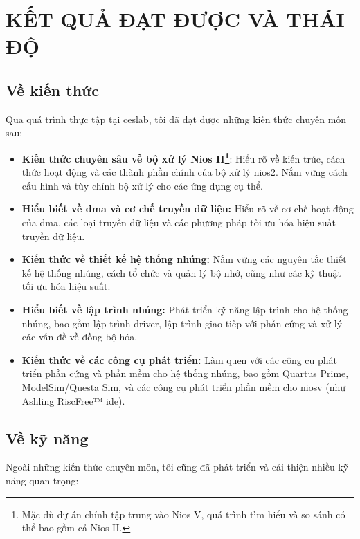 \chapter{KẾT QUẢ ĐẠT ĐƯỢC VÀ THÁI ĐỘ} %
\label{Chapter5}

\section{Về kiến thức} %
\label{sec:knowledge_gained}

Qua quá trình thực tập tại \acrshort{ceslab}, tôi đã đạt được những kiến thức chuyên môn sau:

\begin{itemize}
    \item \textbf{Kiến thức chuyên sâu về bộ xử lý Nios II\footnote{Mặc dù dự án chính tập trung vào Nios V, quá trình tìm hiểu và so sánh có thể bao gồm cả Nios II.}}: Hiểu rõ về kiến trúc, cách thức hoạt động và các thành phần chính của bộ xử lý \acrshort{nios2}. Nắm vững cách cấu hình và tùy chỉnh bộ xử lý cho các ứng dụng cụ thể. 
    \item \textbf{Hiểu biết về \acrshort{dma} và cơ chế truyền dữ liệu:} Hiểu rõ về cơ chế hoạt động của \acrshort{dma}, các loại truyền dữ liệu và các phương pháp tối ưu hóa hiệu suất truyền dữ liệu.
    \item \textbf{Kiến thức về thiết kế hệ thống nhúng:} Nắm vững các nguyên tắc thiết kế hệ thống nhúng, cách tổ chức và quản lý bộ nhớ, cũng như các kỹ thuật tối ưu hóa hiệu suất.
    \item \textbf{Hiểu biết về lập trình nhúng:} Phát triển kỹ năng lập trình cho hệ thống nhúng, bao gồm lập trình driver, lập trình giao tiếp với phần cứng và xử lý các vấn đề về đồng bộ hóa.
    \item \textbf{Kiến thức về các công cụ phát triển:} Làm quen với các công cụ phát triển phần cứng và phần mềm cho hệ thống nhúng, bao gồm Quartus Prime, ModelSim/Questa Sim, và các công cụ phát triển phần mềm cho \acrshort{niosv} (như Ashling RiscFree™ \acrshort{ide}). 
\end{itemize}

\section{Về kỹ năng}
\label{sec:skills_developed}

Ngoài những kiến thức chuyên môn, tôi cũng đã phát triển và cải thiện nhiều kỹ năng quan trọng:

